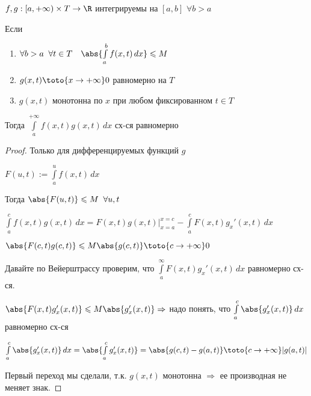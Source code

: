 
\begin{theorem}\thmslashn
	
	$f, g: [a, +\infty)\times T \to \R$ интегрируемы на $[a, b]$ $\forall b > a$
	
	Если \begin{enumerate}[1)]
		\item 
		$\forall b > a\;\; \forall t \in T \quad \abs{\int\limits_{a}^{b} f(x, t)\,dx} \leqslant M$
		
		\item
		$g(x, t) \toto{x\to +\infty} 0$ равномерно на $T$
		
		\item
		$g(x, t)$ монотонна по $x$ при любом фиксированном $t \in T$
	\end{enumerate}

	Тогда $\int\limits_{a}^{+\infty} f(x, t)g(x, t)\,dx$ сх-ся равномерно
	
\end{theorem}

\begin{proof}
	Только для дифференцируемых  функций $g$ 
	
	$F(u, t) := \int\limits_{a}^{u} f(x, t)\,dx$
	
	Тогда $\abs{F(u, t)} \leqslant M \;\; \forall u, t$
	
	$\int\limits_{a}^{c} f(x, t)g(x, t) \, dx = F(x, t)g(x, t) \Big|_{x = a}^{x = c} - \int\limits_{a}^{c} F(x, t)g_x'(x, t) \, dx$
	
	$\abs{F(c, t) g(c, t)} \leqslant M \abs{g(c, t)} \toto{c\to + \infty} 0$
	
	Давайте по Вейерштрассу проверим, что $\int\limits_{a}^{\infty} F(x, t)g_x'(x, t) \, dx$ равномерно сх-ся.
	
	$\abs{F(x, t)g_x'(x, t)} \leqslant M \abs{g_x'(x, t)} \Rightarrow $ надо понять, что $\int\limits_{a}^{c} \abs{g_x'(x, t)} \, dx$ равномерно сх-ся
	
	$\int\limits_{a}^{c} \abs{g_x'(x, t)} \, dx = \abs{\int\limits_{a}^{c} g_x'(x, t)} = \abs{g(c, t) - g(a, t)} \toto{c\to+\infty} |g(a, t)|$
	
	Первый переход мы сделали, т.к. $g(x, t)$ монотонна $\Rightarrow$ ее производная не меняет знак.
	
\end{proof}


